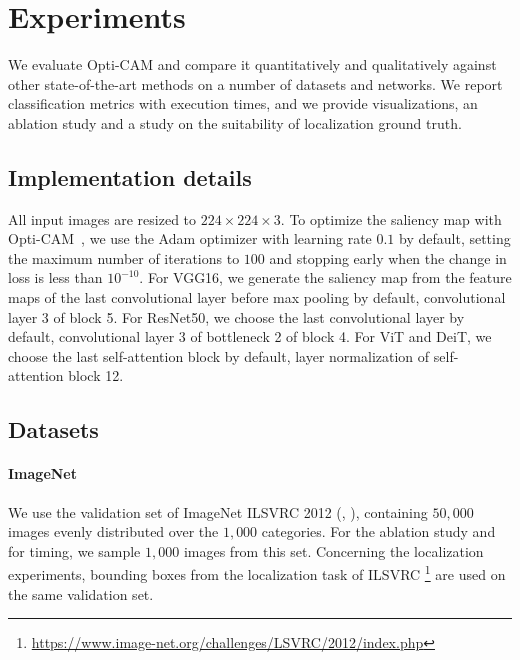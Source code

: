 \section{Experiments}
\label{sec:oc_exp}
We evaluate Opti-CAM and compare it quantitatively and qualitatively against other state-of-the-art 
methods on a number of datasets and networks. We report classification metrics with execution times, 
and we provide visualizations, an ablation study and a study on the suitability of localization 
ground truth.

\subsection{Implementation details}
\label{sec:oc_details}

All input images are resized to $224 \times 224 \times 3$. To optimize the saliency map with 
Opti-CAM~, we use the Adam \autocite{kingma2014adam} optimizer with learning rate $0.1$ by 
default, setting the maximum number of iterations to $100$ and stopping early when the change in 
loss is less than $10^{-10}$. For VGG16, we generate the saliency map  from the feature 
maps of the last convolutional layer before max pooling by default, \ie convolutional layer 3 of 
block 5. For ResNet50, we choose the last convolutional layer by default, \ie convolutional layer 3 
of bottleneck 2 of block 4. For ViT and DeiT, we choose the last self-attention block by default, 
\ie layer normalization of self-attention block 12. 

\subsection{Datasets}
\label{sec:oc_data}

\paragraph{ImageNet}
We use the validation set of ImageNet ILSVRC 2012 (\cite{krizhevsky2012imagenet}, \cite{ILSVRC15}), 
containing $50,000$ images evenly distributed over the $1,000$ categories. For the ablation study 
and for timing, we sample $1,000$ images from this set. Concerning the localization experiments, 
bounding boxes from the localization task of ILSVRC
\footnote{\url{https://www.image-net.org/challenges/LSVRC/2012/index.php}} are used on the same 
validation set.

